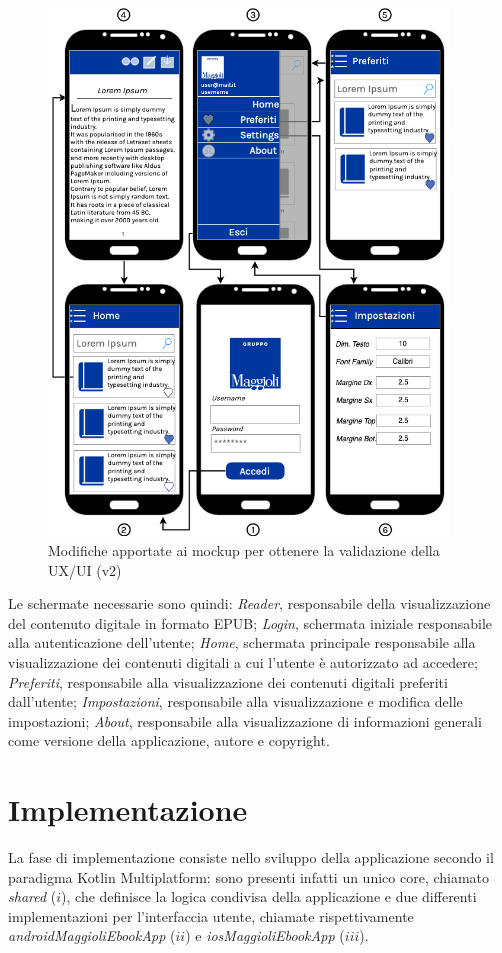 \begin{figure}[H]
\centering
\includegraphics[width=0.95\textwidth]{img/tesi-23-mockupv2.drawio.png}
\caption{Modifiche apportate ai mockup per ottenere la validazione della UX/UI (v2)}
\end{figure}

Le schermate necessarie sono quindi: \textit{Reader}, responsabile della visualizzazione del contenuto digitale in formato EPUB; \textit{Login}, schermata iniziale responsabile alla autenticazione dell'utente; \textit{Home}, schermata principale responsabile alla visualizzazione dei contenuti digitali a cui l'utente è autorizzato ad accedere; \textit{Preferiti}, responsabile alla visualizzazione dei contenuti digitali preferiti dall'utente; \textit{Impostazioni}, responsabile alla visualizzazione e modifica delle impostazioni; \textit{About}, responsabile alla visualizzazione di informazioni generali come versione della applicazione, autore e copyright.

\section{Implementazione}
La fase di implementazione consiste nello sviluppo della applicazione secondo il paradigma Kotlin Multiplatform: sono presenti infatti un unico core, chiamato \textit{shared} ($i$), che definisce la logica condivisa della applicazione e due differenti implementazioni per l'interfaccia utente, chiamate rispettivamente \textit{androidMaggioliEbookApp} ($ii$) e \textit{iosMaggioliEbookApp} ($iii$).

